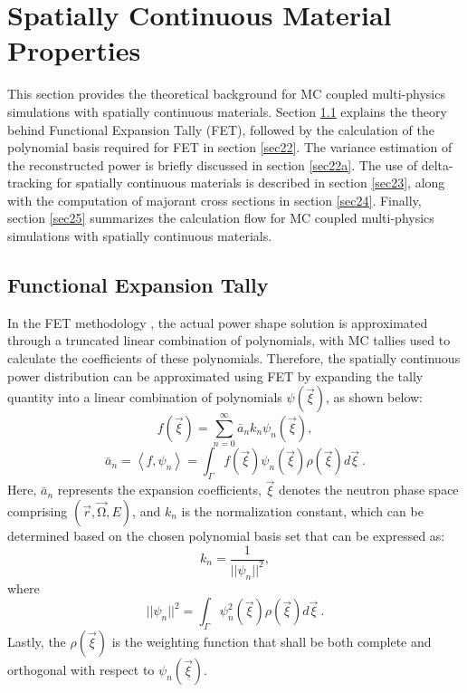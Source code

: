 \newpage 
\section{Spatially Continuous Material Properties} \label{s2}

This section provides the theoretical background for MC coupled multi-physics simulations with spatially continuous materials. Section \ref{sec21} explains the theory behind Functional Expansion Tally (FET), followed by the calculation of the polynomial basis required for FET in section \ref{sec22}. The variance estimation of the reconstructed power is briefly discussed in section \ref{sec22a}. The use of delta-tracking for spatially continuous materials is described in section \ref{sec23}, along with the computation of majorant cross sections in section \ref{sec24}. Finally, section \ref{sec25} summarizes the calculation flow for MC coupled multi-physics simulations with spatially continuous materials.

\subsection{Functional Expansion Tally} \label{sec21}

In the FET methodology \cite{gries, ellis}, the actual power shape solution is approximated through a truncated linear combination of polynomials, with MC tallies used to calculate the coefficients of these polynomials. Therefore, the spatially continuous power distribution can be approximated using FET by expanding the tally quantity into a linear combination of polynomials $\psi(\vec{\xi})$, as shown below:
\begin{equation}
    f\left(\vec{\xi}\right)=\sum_{n=0}^{\infty}{{\bar{a}}_nk_n\psi_n\left(\vec{\xi}\right)},
    \label{eq1}
\end{equation}
\begin{equation}
    {\bar{a}}_n=\left\langle f,\psi_n\right\rangle=\int_{\Gamma}{f\left(\vec{\xi}\right)\psi_n\left(\vec{\xi}\right)\rho\left(\vec{\xi}\right)d\vec{\xi}\ .}
    \label{eq2}
\end{equation}
Here, ${\bar{a}}_n$ represents the expansion coefficients, $\vec{\xi}$ denotes the neutron phase space comprising $\left(\vec{r},\vec{\mathrm{\Omega}},E\right)$, and $k_n$ is the normalization constant, which can be determined based on the chosen polynomial basis set that can be expressed as:
\begin{equation}
    k_n=\frac{1}{||\psi_n||^2},
\end{equation}
where
\begin{equation}
    ||\psi_n||^2=\int_{\Gamma}{\psi_n^2\left(\vec{\xi}\right)\rho\left(\vec{\xi}\right)d}\vec{\xi}\ .
    \label{eq4}
\end{equation}
Lastly, the $\rho\left(\vec{\xi}\right)$ is the weighting function that shall be both complete and orthogonal with respect to $\psi_n\left(\vec{\xi}\right)$.

